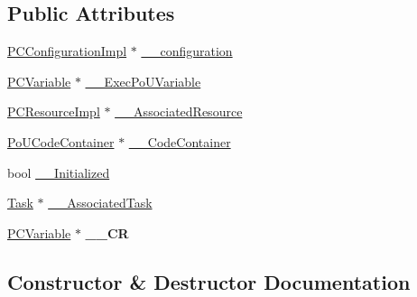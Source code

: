 \subsection*{Public Attributes}
\begin{DoxyCompactItemize}
\item 
\hyperlink{classpc__emulator_1_1PCConfigurationImpl}{P\+C\+Configuration\+Impl} $\ast$ \hyperlink{classpc__emulator_1_1Executor_abcffb5c87513b158451390af932327e6}{\+\_\+\+\_\+configuration}
\item 
\hyperlink{classpc__emulator_1_1PCVariable}{P\+C\+Variable} $\ast$ \hyperlink{classpc__emulator_1_1Executor_a5b88e4a18e03884a98ae194c40d08803}{\+\_\+\+\_\+\+Exec\+Po\+U\+Variable}
\item 
\hyperlink{classpc__emulator_1_1PCResourceImpl}{P\+C\+Resource\+Impl} $\ast$ \hyperlink{classpc__emulator_1_1Executor_a08c9e456c5329834f50141d7add91a9f}{\+\_\+\+\_\+\+Associated\+Resource}
\item 
\hyperlink{classpc__emulator_1_1PoUCodeContainer}{Po\+U\+Code\+Container} $\ast$ \hyperlink{classpc__emulator_1_1Executor_a26032bb8f4fec484e14f32d07db89f5d}{\+\_\+\+\_\+\+Code\+Container}
\item 
bool \hyperlink{classpc__emulator_1_1Executor_a8c58feead8d23b32927237f2f6fc5c7a}{\+\_\+\+\_\+\+Initialized}
\item 
\hyperlink{classpc__emulator_1_1Task}{Task} $\ast$ \hyperlink{classpc__emulator_1_1Executor_ac1f6ee2ee941691f69f0d51827fd2a06}{\+\_\+\+\_\+\+Associated\+Task}
\item 
\hyperlink{classpc__emulator_1_1PCVariable}{P\+C\+Variable} $\ast$ {\bfseries \+\_\+\+\_\+\+CR}\hypertarget{classpc__emulator_1_1Executor_a9946f739f53375d187386eebc60a174c}{}\label{classpc__emulator_1_1Executor_a9946f739f53375d187386eebc60a174c}

\end{DoxyCompactItemize}


\subsection{Constructor \& Destructor Documentation}
